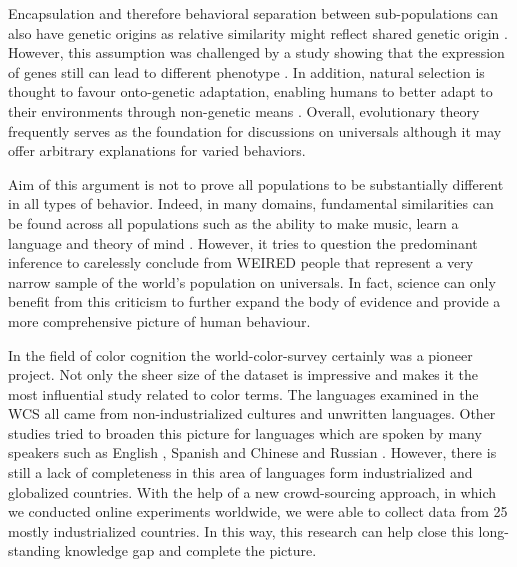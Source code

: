     Encapsulation and therefore behavioral separation between sub-populations can also have genetic origins as relative similarity might reflect shared genetic origin \parencite{roseShared1988}. However, this assumption was challenged by a study showing that the expression of genes still can lead to different phenotype \parencite{kimCulture2010}. In addition, natural selection is thought to favour onto-genetic adaptation, enabling humans to better adapt to their environments through non-genetic means \parencite{henrichWeirdest2010}. Overall, evolutionary theory frequently serves as the foundation for discussions on universals although it may offer arbitrary explanations for varied behaviors. 

Aim of this argument is not to prove all populations to be substantially different in all types of behavior. Indeed, in many domains, fundamental similarities can be found across all populations such as the ability to make music, learn a language and theory of mind \parencite{henrichWeirdest2010}. However, it tries to question the predominant inference to carelessly conclude from WEIRED people that represent a very narrow sample of the world's population on universals. In fact, science can only benefit from this criticism to further expand the body of evidence and provide a more comprehensive picture of human behaviour.

In the field of color cognition the world-color-survey certainly was a pioneer project. Not only the sheer size of the dataset is impressive and makes it the most influential study related to color terms. The languages examined in the WCS all came from non-industrialized cultures and unwritten languages. Other studies tried to broaden this picture for languages which are spoken by many speakers such as English \parencite{lindseyColor2014}, Spanish and Chinese \parencite{xuComparison2023} and Russian \parencite{winawerRussian2007}. However, there is still a lack of completeness in this area of languages form industrialized and globalized countries. With the help of a new crowd-sourcing approach, in which we conducted online experiments worldwide, we were able to collect data from 25 mostly industrialized countries. In this way, this research can help close this long-standing knowledge gap and complete the picture.




